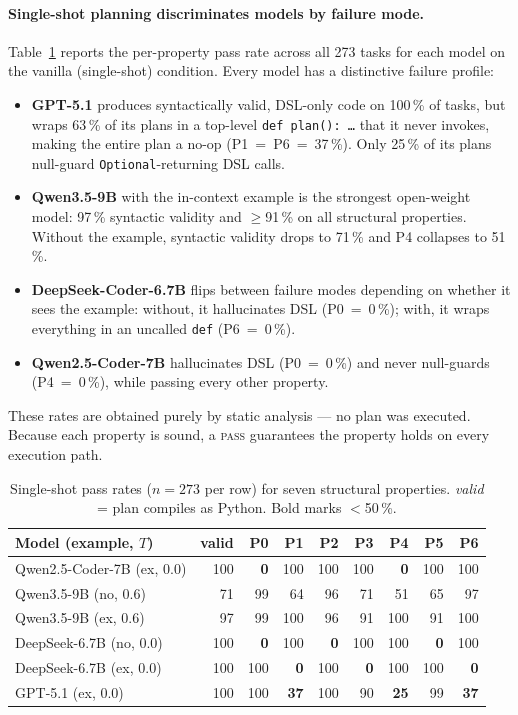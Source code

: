 \paragraph{Single-shot planning discriminates models by failure mode.}
Table~\ref{tab:vanilla-passrates} reports the per-property pass rate across
all 273 tasks for each model on the vanilla (single-shot) condition.  Every
model has a distinctive failure profile:
\begin{itemize}
\item \textbf{GPT-5.1} produces syntactically valid, DSL-only code on 100\,\%
  of tasks, but wraps 63\,\% of its plans in a top-level
  \texttt{def~plan():~\ldots} that it never invokes, making the entire plan a
  no-op (P1~=~P6~=~37\,\%).  Only 25\,\% of its plans null-guard
  \texttt{Optional}-returning DSL calls.
\item \textbf{Qwen3.5-9B} with the in-context example is the strongest
  open-weight model: 97\,\% syntactic validity and $\ge$91\,\% on all
  structural properties.  Without the example, syntactic validity drops to
  71\,\% and P4 collapses to 51\,\%.
\item \textbf{DeepSeek-Coder-6.7B} flips between failure modes depending on
  whether it sees the example: without, it hallucinates DSL
  (P0~=~0\,\%); with, it wraps everything in an uncalled \texttt{def} (P6~=~0\,\%).
\item \textbf{Qwen2.5-Coder-7B} hallucinates DSL (P0~=~0\,\%) and never
  null-guards (P4~=~0\,\%), while passing every other property.
\end{itemize}
These rates are obtained purely by static analysis — no plan was executed.
Because each property is sound, a \textsc{pass} guarantees the property holds
on every execution path.

\begin{table}[h]
\centering
\caption{Single-shot pass rates ($n{=}273$ per row) for seven structural
properties.  \emph{valid} = plan compiles as Python.  Bold marks $<$50\,\%.}
\label{tab:vanilla-passrates}
\small
\begin{tabular}{lrrrrrrrr}
\toprule
Model (example, $T$) & valid & P0 & P1 & P2 & P3 & P4 & P5 & P6 \\
\midrule
Qwen2.5-Coder-7B (ex, 0.0)   & 100 & \textbf{0}   & 100 & 100 & 100 & \textbf{0}  & 100 & 100 \\
Qwen3.5-9B       (no, 0.6)   & 71  & 99           & 64  & 96  & 71  & 51          & 65  & 97  \\
Qwen3.5-9B       (ex, 0.6)   & 97  & 99           & 100 & 96  & 91  & 100         & 91  & 100 \\
DeepSeek-6.7B    (no, 0.0)   & 100 & \textbf{0}   & 100 & \textbf{0} & 100 & 100 & \textbf{0} & 100 \\
DeepSeek-6.7B    (ex, 0.0)   & 100 & 100          & \textbf{0}  & 100 & \textbf{0} & 100 & 100 & \textbf{0} \\
GPT-5.1          (ex, 0.0)   & 100 & 100          & \textbf{37} & 100 & 90  & \textbf{25} & 99  & \textbf{37} \\
\bottomrule
\end{tabular}
\end{table}

